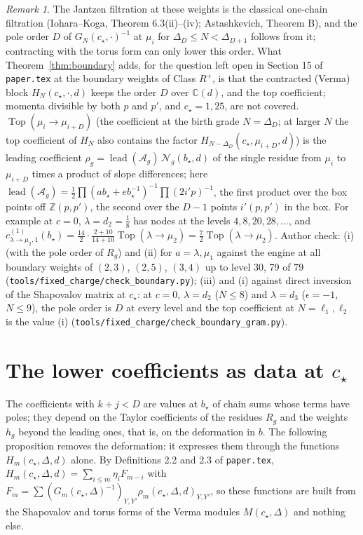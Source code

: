 \documentclass[11pt]{article}
\theoremstyle{remark}
\newtheorem{remark}[theorem]{Remark}
\begin{document}
\begin{remark}
The Jantzen filtration at these weights is the classical one-chain filtration
(Iohara--Koga, Theorem 6.3(ii)--(iv); Astashkevich, Theorem B), and the pole
order $D$ of $G_N(c_\star,\cdot)^{-1}$ at $\mu_i$ for $\Delta_D\le N<\Delta_{D+1}$
follows from it; contracting with the torus form can only lower this order.
What Theorem~\ref{thm:boundary} adds, for the question left open in Section 15
of \texttt{paper.tex} at the boundary weights of Class $R^+$, is that the
contracted (Verma) block $H_N(c_\star,\cdot,d)$ keeps the order $D$ over
$\mathbb C(d)$, and the top coefficient; momenta divisible by both $p$ and $p'$,
and $c_\star=1,25$, are not covered.  $\operatorname{Top}(\mu_i\to\mu_{i+D})$ (the
coefficient at the birth grade $N=\Delta_D$; at larger $N$ the top coefficient
of $H_N$ also contains the factor $H_{N-\Delta_D}(c_\star,\mu_{i+D},d)$) is the leading coefficient $\rho_g=\operatorname{lead}(\mathcal
A_g)\,\mathcal N_g(b_\star,d)$ of the single residue from $\mu_i$ to
$\mu_{i+D}$ times a product of slope differences; here
$\operatorname{lead}(\mathcal A_g)=\frac12\prod(ab_\star+eb_\star^{-1})^{-1}
\prod(2i'p)^{-1}$, the first product over the box points off $\mathbb Z(p,p')$,
the second over the $D-1$ points $i'(p,p')$ in the box.  For example at $c=0$,
$\lambda=d_2=\frac18$ has nodes at the levels $4,8,20,28,\dots$, and
$c^{(1)}_{\lambda\to\mu_2,1}(b_\star)=\frac{14}2\cdot\frac{2+10}{14+10}
\operatorname{Top}(\lambda\to\mu_2)=\frac72\operatorname{Top}(\lambda\to\mu_2)$.
Author check: (i) (with the pole order of $R_g$) and (ii) for $a=\lambda,\mu_1$
against the engine at all boundary weights of $(2,3)$, $(2,5)$, $(3,4)$ up to
level $30$, 79 of 79 (\texttt{tools/fixed\_charge/check\_boundary.py}); (iii) and (i) against
direct inversion of the Shapovalov matrix at $c_\star$: at $c=0$, $\lambda=d_2$
($N\le8$) and $\lambda=d_3$ ($\epsilon=-1$, $N\le9$), the pole order is $D$ at
every level and the top coefficient at $N=\ell_1,\ell_2$ is the value (i)
(\texttt{tools/fixed\_charge/check\_boundary\_gram.py}).
\end{remark}

\section{The lower coefficients as data at $c_\star$}

The coefficients with $k+j<D$ are values at $b_\star$ of chain sums whose terms
have poles; they depend on the Taylor coefficients of the residues $R_g$ and
the weights $h_g$ beyond the leading ones, that is, on the deformation in $b$.
The following proposition removes the deformation: it expresses them through
the functions $H_m(c_\star,\Delta,d)$ alone.  By Definitions 2.2 and 2.3 of
\texttt{paper.tex}, $H_m(c_\star,\Delta,d)=\sum_{i\le m}\eta_iF_{m-i}$ with
$F_m=\sum(G_m(c_\star,\Delta)^{-1})_{Y,Y'}\rho_m(c_\star,\Delta,d)_{Y,Y'}$, so these
functions are built from the Shapovalov and torus forms of the Verma modules
$M(c_\star,\Delta)$ and nothing else.
\end{document}
